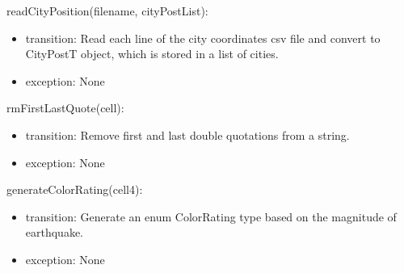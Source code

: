 \documentclass[12pt]{article}
\begin{document}
\noindent readCityPosition(filename, cityPostList):
\begin{itemize}
\item transition: Read each line of the city coordinates csv file and convert to CityPostT object,
 which is stored in a list of cities.
\item exception: None
\end{itemize}

\noindent rmFirstLastQuote(cell):
\begin{itemize}
\item transition: Remove first and last double quotations from a string.
\item exception: None
\end{itemize}

\noindent generateColorRating(cell4):
\begin{itemize}
\item transition: Generate an enum ColorRating type based on the magnitude of earthquake.
\item exception: None
\end{itemize}
\end{document}

